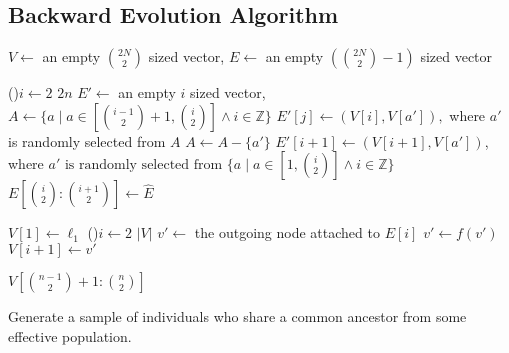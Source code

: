 \subsection{Backward Evolution Algorithm}\label{subsec:backwardEvolutionAlgorithm}
\begin{algorithm}[t]
    \SetAlgoLined
    \DontPrintSemicolon
     {
        $V \gets $ an empty $\binom{2N}{2}$ sized vector,
        $E \gets $ an empty $(\binom{2N}{2} - 1)$ sized vector \;

        \For(){$i \gets 2$ \KwTo $2n$} {
            $E' \gets $ an empty $i$ sized vector,
            $A \gets \{ a \mid a \in [\binom{i - 1}{2} + 1, \binom{i}{2}] \land i \in \mathbb{Z} \}$ \;
             {
                $E'[j] \gets (V[i], V[a']),$ where $a'$ is randomly selected from $A$ \;
                $A \gets A - \{ a' \}$ \;
            }
            $E'[i + 1] \gets (V[i + 1], V[a'])$, where $ a' \text{ is randomly selected from } \{ a \mid a \in
            [1, \binom{i}{2}] \land i \in \mathbb{Z} \}$ \; \label{algline:coalescentEvent}
            $E[\binom{i}{2}:\binom{i + 1}{2}] \gets \hat{E}$ \;
        }

        $V[1] \gets \ell_1$ \;
        \For(){$i \gets 2$ \KwTo $| V |$} {
            $v' \gets $ the outgoing node attached to $E[i]$ \;
             {
                $v' \gets f(v')$ \;
            }
            $V[i + 1] \gets v'$ \;
        }

        \Return $V[\binom{n - 1}{2} + 1:\binom{n}{2}]$ \;
    }
    \caption{Generate a sample of individuals who share a common ancestor from some effective population.}
    \label{alg:twoStageBackwardEvolution}
\end{algorithm}

